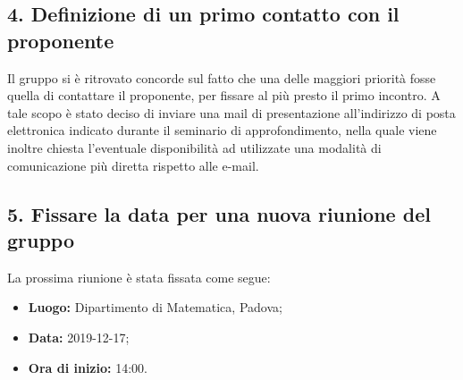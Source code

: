 \subsection*{4. Definizione di un primo contatto con il proponente}

Il gruppo si è ritrovato concorde sul fatto che una delle maggiori priorità fosse quella di contattare il proponente, per fissare al più presto il primo incontro.
A tale scopo è stato deciso di inviare una mail di presentazione all'indirizzo di posta elettronica indicato durante il seminario di approfondimento, nella quale viene inoltre chiesta l'eventuale disponibilità ad utilizzate una modalità di comunicazione più diretta rispetto alle e-mail.

\subsection*{5. Fissare la data per una nuova riunione del gruppo}

La prossima riunione è stata fissata come segue:
\begin{itemize}
	\item \textbf{Luogo:} Dipartimento di Matematica, Padova;
	\item \textbf{Data:} 2019-12-17;
	\item \textbf{Ora di inizio:} 14:00.
\end{itemize}